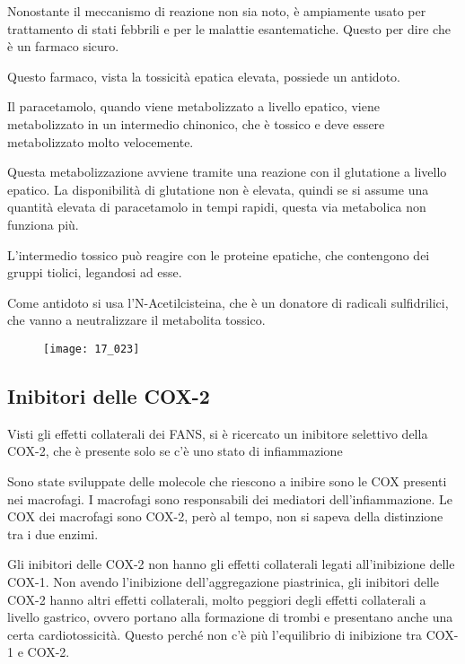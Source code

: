 Nonostante il meccanismo di reazione non sia noto, è ampiamente usato
per trattamento di stati febbrili e per le malattie esantematiche. Questo
per dire che è un farmaco sicuro.

Questo farmaco, vista la tossicità epatica elevata, possiede un
antidoto.


Il paracetamolo, quando viene metabolizzato a livello epatico, viene
metabolizzato in un intermedio chinonico, che è tossico e deve essere
metabolizzato molto velocemente.

Questa metabolizzazione avviene tramite
una reazione con il glutatione a livello epatico. La disponibilità di
glutatione non è elevata, quindi se si assume una quantità elevata di
paracetamolo in tempi rapidi, questa via metabolica non funziona più.

L'intermedio tossico può reagire con le proteine epatiche, che
contengono dei gruppi tiolici, legandosi ad esse.

Come antidoto si usa l'N-Acetilcisteina, che è un donatore di radicali
sulfidrilici, che vanno a neutralizzare il metabolita tossico.

\begin{figure}[H]
    \centering
\texttt{[image: 17\_023]}
\end{figure}

\clearpage

\subsection{Inibitori delle COX-2}

Visti gli effetti collaterali dei FANS, si è ricercato un inibitore
selettivo della COX-2, che è presente solo se c'è uno stato di
infiammazione


Sono state sviluppate delle molecole che riescono a inibire sono le COX
presenti nei macrofagi. I macrofagi sono responsabili dei mediatori
dell'infiammazione. Le COX dei macrofagi sono COX-2, però al tempo, non
si sapeva della distinzione tra i due enzimi.

Gli inibitori delle COX-2 non hanno gli effetti collaterali legati
all'inibizione delle COX-1. Non avendo l'inibizione dell'aggregazione
piastrinica, gli inibitori delle COX-2 hanno altri effetti collaterali,
molto peggiori degli effetti collaterali a livello gastrico, ovvero
portano alla formazione di trombi e presentano anche una certa
cardiotossicità. Questo perché non c'è più l'equilibrio di inibizione
tra COX-1 e COX-2.

